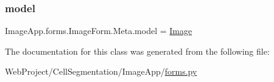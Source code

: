 \subsubsection{\texorpdfstring{model}{model}}
{\footnotesize\ttfamily Image\+App.\+forms.\+Image\+Form.\+Meta.\+model = \mbox{\hyperlink{class_image_app_1_1models_1_1_image}{Image}}\hspace{0.3cm}{\ttfamily [static]}}



The documentation for this class was generated from the following file\+:\begin{DoxyCompactItemize}
\item 
Web\+Project/\+Cell\+Segmentation/\+Image\+App/\mbox{\hyperlink{forms_8py}{forms.\+py}}\end{DoxyCompactItemize}
